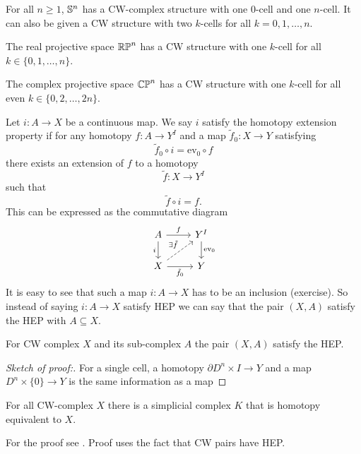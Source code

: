 \begin{example}
	For all \(n \geq 1\), \(\mathbb{S}^{n}\) has a CW-complex structure with one \(0\)-cell and one \(n\)-cell.
	It can also be given a CW structure with two \(k\)-cells for all \(k = 0, 1, \dots, n\).
	
	The real projective space \(\mathbb{RP}^{n}\) has a CW structure with one \(k\)-cell for all \(k \in \{0, 1, \dots, n\}\).
	
	The complex projective space \(\mathbb{CP}^{n}\) has a CW structure with one \(k\)-cell for all even \(k \in \{0, 2, \dots, 2n\}\).
\end{example}

\begin{definition}
	Let $i : A \to X$ be a continuous map.
	We say $i$ satisfy the homotopy extension property if for any homotopy $f: A \to Y^I$ and a map $\tilde{f}_0: X \to Y$ satisfying 
	\[\tilde{f}_0 \circ i = \mathrm{ev}_0 \circ f\]
	there exists an extension of $f$ to a homotopy
	\[\tilde{f} : X \to Y^I\] 
	such that 
	\[\tilde{f} \circ i = f.\]
	This can be expressed as the commutative diagram 
	\[\begin{tikzcd}
		A\ar[r, "f"]\ar[d, "i"'] & Y^I \ar[d, "\mathrm{ev}_0"] \\
		X \ar[r, "\tilde{f}_0"']\ar[ru, "\exists \tilde{f}", dashed]& Y
	\end{tikzcd}\]
	It is easy to see that such a map \(i: A \to X\) has to be an inclusion (exercise).
	So instead of saying \(i : A \to X\) satisfy HEP we can say that the pair \((X,A)\) satisfy the HEP with \(A \subseteq X\).
\end{definition}

\begin{proposition}
	For CW complex \(X\) and its sub-complex \(A\) the pair \((X,A)\) satisfy the HEP. 
\end{proposition}
\begin{proof}[Sketch of proof:]
	For a single cell, a homotopy \(\partial D^n \times I \to Y\) and a map \(D^n \times \{0\} \to Y\) is the same information as a map 
\end{proof}

\begin{proposition}
	\label{simplical approx.}
	For all CW-complex \(X\) there is a simplicial complex \(K\) that is homotopy equivalent to \(X\).
\end{proposition}
For the proof see \cite[\S 2]{griffiths_rational_2013}. 
Proof uses the fact that CW pairs have HEP.


